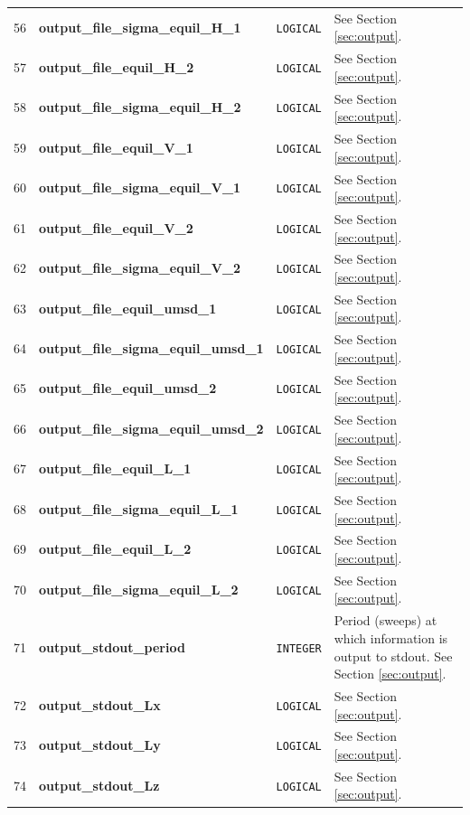 \documentclass{report}
\begin{document}
\begin{landscape}
\begin{center}
\begin{longtable}{l l l p{8cm}}
56 & \textbf{output\_file\_sigma\_equil\_H\_1}  &  \texttt{LOGICAL}  & See Section \ref{sec:output}. \\
57 & \textbf{output\_file\_equil\_H\_2}  &  \texttt{LOGICAL}  & See Section \ref{sec:output}. \\
58 & \textbf{output\_file\_sigma\_equil\_H\_2}  &  \texttt{LOGICAL}  & See Section \ref{sec:output}. \\
59 & \textbf{output\_file\_equil\_V\_1}  &  \texttt{LOGICAL}  & See Section \ref{sec:output}. \\
60 & \textbf{output\_file\_sigma\_equil\_V\_1}  &  \texttt{LOGICAL}  & See Section \ref{sec:output}. \\
61 & \textbf{output\_file\_equil\_V\_2}  &  \texttt{LOGICAL}  & See Section \ref{sec:output}. \\
62 & \textbf{output\_file\_sigma\_equil\_V\_2}  &  \texttt{LOGICAL}  & See Section \ref{sec:output}. \\
63 & \textbf{output\_file\_equil\_umsd\_1}  &  \texttt{LOGICAL}  & See Section \ref{sec:output}. \\
64 & \textbf{output\_file\_sigma\_equil\_umsd\_1}  &  \texttt{LOGICAL}  & See Section \ref{sec:output}. \\
65 & \textbf{output\_file\_equil\_umsd\_2}  &  \texttt{LOGICAL}  & See Section \ref{sec:output}. \\
66 & \textbf{output\_file\_sigma\_equil\_umsd\_2}  &  \texttt{LOGICAL}  & See Section \ref{sec:output}. \\
67 & \textbf{output\_file\_equil\_L\_1} &  \texttt{LOGICAL}  & See Section \ref{sec:output}. \\
68 & \textbf{output\_file\_sigma\_equil\_L\_1} &  \texttt{LOGICAL}  & See Section \ref{sec:output}. \\
69 & \textbf{output\_file\_equil\_L\_2} &  \texttt{LOGICAL}  & See Section \ref{sec:output}. \\
70 & \textbf{output\_file\_sigma\_equil\_L\_2} &  \texttt{LOGICAL}  & See Section \ref{sec:output}. \\
71 & \textbf{output\_stdout\_period}  &  \texttt{INTEGER}  & Period (sweeps) at which information is output to stdout. See Section \ref{sec:output}. \\
72 & \textbf{output\_stdout\_Lx}  &  \texttt{LOGICAL}  & See Section \ref{sec:output}. \\
73 & \textbf{output\_stdout\_Ly}  &  \texttt{LOGICAL}  & See Section \ref{sec:output}. \\
74 & \textbf{output\_stdout\_Lz}  &  \texttt{LOGICAL}  & See Section \ref{sec:output}. \\

\end{longtable}
\end{center}
\end{landscape}
\end{document}
